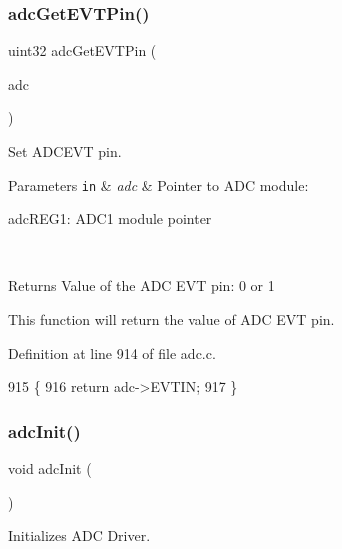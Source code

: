 \subsubsection{\texorpdfstring{adc\+Get\+E\+V\+T\+Pin()}{adcGetEVTPin()}}
{\footnotesize\ttfamily uint32 adc\+Get\+E\+V\+T\+Pin (\begin{DoxyParamCaption}\item[{\mbox{\hyperlink{reg__adc_8h_ab98b3b090eb1fd96596cd337a5fc0a4e}{adc\+B\+A\+S\+E\+\_\+t}} $\ast$}]{adc }\end{DoxyParamCaption})}



Set A\+D\+C\+E\+VT pin. 


\begin{DoxyParams}[1]{Parameters}
\mbox{\tt in}  & {\em adc} & Pointer to A\+DC module\+:
\begin{DoxyItemize}
\item adc\+R\+E\+G1\+: A\+D\+C1 module pointer 
\end{DoxyItemize}\\
\hline
\end{DoxyParams}
\begin{DoxyReturn}{Returns}
Value of the A\+DC E\+VT pin\+: 0 or 1
\end{DoxyReturn}
This function will return the value of A\+DC E\+VT pin. 

Definition at line 914 of file adc.\+c.


\begin{DoxyCode}
915 \{
916     \textcolor{keywordflow}{return} adc->EVTIN;
917 \}
\end{DoxyCode}
\mbox{\label{group__ADC_gafd645b17cf0581bcaa22c56011c775e4}} 
\subsubsection{\texorpdfstring{adc\+Init()}{adcInit()}}
{\footnotesize\ttfamily void adc\+Init (\begin{DoxyParamCaption}\item[{void}]{ }\end{DoxyParamCaption})}



Initializes A\+DC Driver. 

